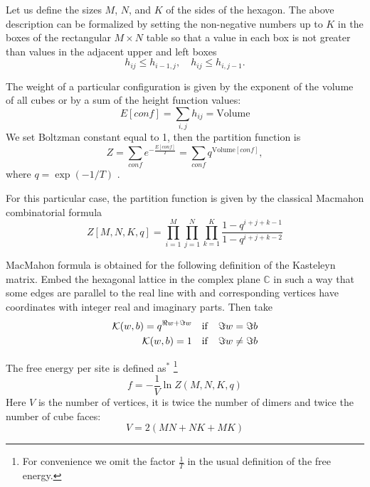 \documentclass{article}
\begin{document}
Let us define the sizes $M$, $N$, and $K$ of the sides of the hexagon.
The above description can be formalized by
setting the non-negative numbers up to $K$ in the boxes of the rectangular $M\times N$ table so that a value in
each box is not greater than values in the adjacent upper and left boxes
\begin{equation}
  \label{eq:1}
  h_{ij}\leq h_{i-1,j},\quad h_{ij}\leq h_{i,j-1}.
\end{equation}

The weight of a particular configuration is given by the exponent of the volume of all cubes or by a
sum of the height function values:
\begin{equation*}
  \label{eq:10}
  E[conf]=\sum_{i,j} h_{ij}=\mathrm{Volume}
\end{equation*}
We set Boltzman constant equal to 1, then the partition function is 
\begin{equation*}
  \label{eq:14}
  Z=\sum_{conf} e^{-\frac{E[conf]}{T}}=\sum_{conf}q^{\mathrm{Volume}[conf]}, 
\end{equation*}
where $q=\exp\left(-1/T\right)$ .

For this particular case, the partition function is given by the classical Macmahon combinatorial
formula~\cite{vuletic2009generalization}
\begin{equation}
  \label{eq:12}
   Z[M,N,K,q]=\prod_{i=1}^{M}\prod_{j=1}^{N}\prod_{k=1}^{K}\frac{1-q^{i+j+k-1}}{1-q^{i+j+k-2}}
\end{equation}


MacMahon formula is obtained for the following definition of the Kasteleyn matrix. Embed the
hexagonal lattice in the complex plane $\mathbb{C}$ in such a way that some edges are parallel to
the real line with and corresponding vertices have coordinates with integer real and imaginary
parts. Then take
\begin{eqnarray}
  \label{eq:18}
  {\cal K}(w,b)=q^{\Re w+\Im w} \quad \mathrm{if}\quad \Im w=\Im b\\
  {\cal K}(w,b)=1 \quad \mathrm{if}\quad \Im w\neq\Im b
\end{eqnarray}


The   free energy per site is defined as$^{*}$
\footnote{For convenience we omit the factor $\frac{1}{T}$ in the usual definition of the free energy.}
\begin{equation*}
  \label{eq:17}
  f=-\frac{1}{V}\ln Z(M,N,K,q)
\end{equation*}
Here $V$ is the number of vertices, it is twice the number of dimers and twice the number of  cube faces:
\begin{equation*}
  \label{eq:19}
  V=2(MN+NK+MK)
\end{equation*}
\end{document}
